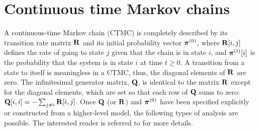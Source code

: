 \section{Continuous time Markov chains}
A continuous-time Markov chain (CTMC)
is completely described by its transition
rate matrix $\mathbf{R}$ and its initial probability vector
$\mbox{\boldmath{${\pi}$}}^{(0)}$, where $\mathbf{R}[i,j]$ defines the rate of going to state
$j$ given that the chain is in state $i$, and
$\mbox{\boldmath{${\pi}$}}^{(t)}[i]$ is the probability that the system is
in state $i$ at time $t \geq 0$.
A transition from a state to itself is meaningless in a CTMC,
thus, the diagonal elements of $\mathbf{R}$ are zero.
The infinitesimal generator matrix, $\mathbf{Q}$, is identical to the matrix $\mathbf{R}$
except for the diagonal elements, which are set so that each row of
$\mathbf{Q}$ sums to zero: $\mathbf{Q}[i,i] = - \sum_{j \neq i} \mathbf{R}[i,j]$.
Once $\mathbf{Q}$ (or $\mathbf{R}$) and $\mbox{\boldmath{${\pi}$}}^{(0)}$ have been specified explicitly
or constructed from a higher-level model, the following types of analysis
are possible.
The interested reader is referred to \cite{1993IMA-SRNs,Stewart1994book}
for more details.

